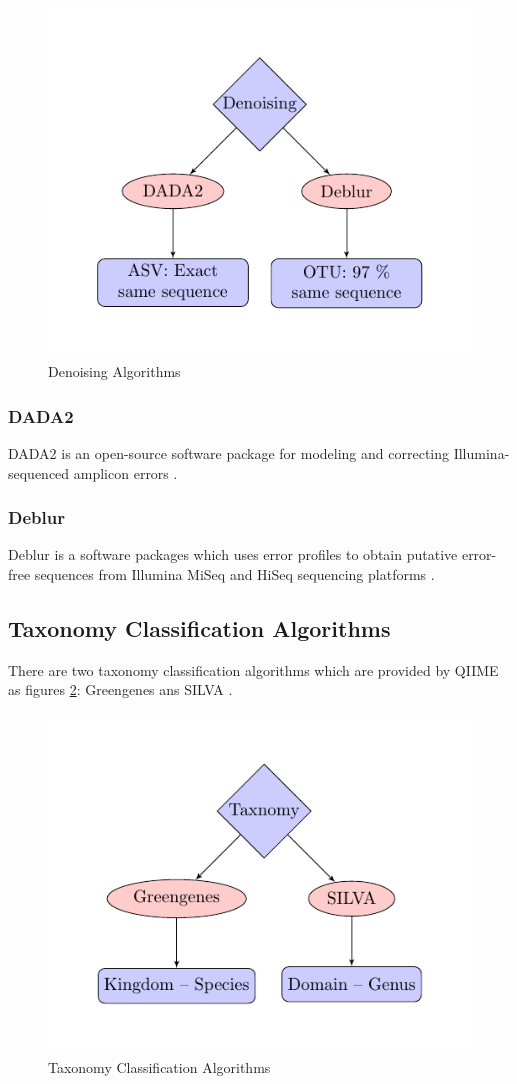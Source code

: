 \documentclass[a4paper]{article}
\begin{document}
            \begin{figure}[p]
                \centering
                \includegraphics[width=0.3 \linewidth]{figures/tikz/denoising.pdf}
                \caption{Denoising Algorithms}
                \label{fig:denoising}
            \end{figure}

            \subsubsection{DADA2}
                DADA2 is an open-source software package for modeling and correcting Illumina-sequenced amplicon errors \cite{DADA2}.

            \subsubsection{Deblur}
                Deblur is a software packages which uses error profiles to obtain putative error-free sequences from Illumina MiSeq and HiSeq sequencing platforms \cite{Deblur1}.

        \subsection{Taxonomy Classification Algorithms}
            There are two taxonomy classification algorithms which are provided by QIIME as figures \ref{fig:taxonomy}: Greengenes \cite{greengenes1} ans SILVA \cite{silva1, silva2}.

            \begin{figure}[p]
                \centering
                \includegraphics[width=0.3 \linewidth]{figures/tikz/taxonomy.pdf}
                \caption{Taxonomy Classification Algorithms}
                \label{fig:taxonomy}
            \end{figure}
\end{document}
